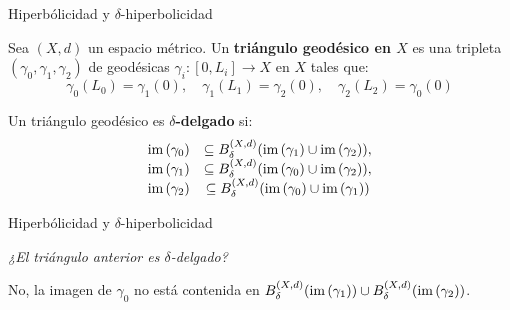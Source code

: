 \documentclass[xcolor=dvipsnames]{beamer}
\theoremstyle{largebreak}
\newcommand\cf[3]{\ensuremath{#1:#2\rightarrow#3}}
\newcommand{\im}[1]{\ensuremath{\textup{im}\left(#1\right)}}
\begin{document}
\begin{frame}{Hiperbólicidad y $\delta$-hiperbolicidad}
    \begin{mydef}
        Sea $(X,d)$ un espacio métrico. Un \textbf{triángulo geodésico en $X$} es una tripleta $(\gamma_0,\gamma_1,\gamma_2)$ de geodésicas $\cf{\gamma_i}{[0,L_i]}{X}$ en $X$ tales que:
        \begin{equation*}
            \gamma_0(L_0)=\gamma_1(0),\quad \gamma_1(L_1)=\gamma_2(0),\quad \gamma_2(L_2)=\gamma_0(0)
        \end{equation*}
    \end{mydef}

    \begin{mydef}
        Un triángulo geodésico es \textbf{$\delta$-delgado} si:
        \begin{equation*}
            \begin{array}{cc}
                \im{\gamma_0}&\subseteq B_{\delta}^{(X,d)}(\im{\gamma_1}\cup\im{\gamma_2}),\\
                \im{\gamma_1}&\subseteq B_{\delta}^{(X,d)}(\im{\gamma_0}\cup\im{\gamma_2}),\\
                \im{\gamma_2}&\subseteq B_{\delta}^{(X,d)}(\im{\gamma_0}\cup\im{\gamma_1})
            \end{array}
        \end{equation*}
    \end{mydef}
\end{frame}

\begin{frame}{Hiperbólicidad y $\delta$-hiperbolicidad}
    \begin{center}
        \textit{\Large ¿El triángulo anterior es $\delta$-delgado?}
    \end{center}
    \pause
    \begin{center}
        \Large No, la imagen de $\gamma_0$ no está contenida en $B_\delta^{(X,d)}(\im{\gamma_1})\cup B_\delta^{(X,d)}(\im{\gamma_2})$.
    \end{center}
\end{frame}
\end{document}

